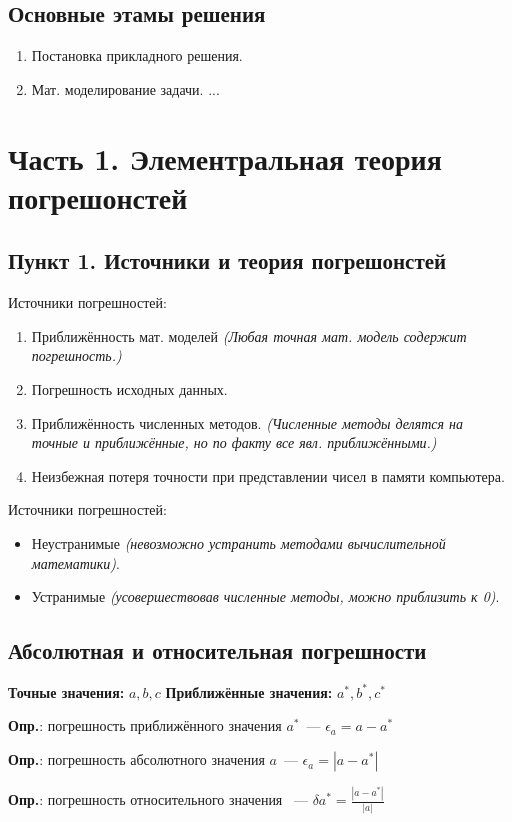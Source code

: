 \subsection{Основные этамы решения}

\begin{enumerate}
    \item Постановка прикладного решения.
    \item Мат. моделирование задачи.
    ...
\end{enumerate}


\section{Часть 1. Элементральная теория погрешонстей}

\subsection{Пункт 1. Источники и теория погрешонстей}

\noindent Источники погрешностей:
\begin{enumerate}
    \item Приближённость мат. моделей \textit{(Любая точная мат. модель содержит погрешность.)}
    \item Погрешность исходных данных.
    \item Приближённость численных методов. \textit{(Численные методы делятся на точные и приближённые, но по факту все явл. приближёнными.)}
    \item Неизбежная потеря точности при представлении чисел в памяти компьютера.
\end{enumerate}

\noindent Источники погрешностей:

\begin{itemize}
    \item Неустранимые \textit{(невозможно устранить методами вычислительной математики)}.
    \item Устранимые \textit{(усовершествовав численные методы, можно приблизить к 0)}.
\end{itemize}

\subsection{Абсолютная и относительная погрешности}

\textbf{Точные значения:} $a, b, c$
\textbf{Приближённые значения:} $a^*, b^*, c^*$

\noindent\textbf{Опр.}: погрешность приближённого значения $a^*$~--- $\epsilon_a = a - a^*$

\noindent\textbf{Опр.}: погрешность абсолютного значения $a$~--- $\epsilon_a = |a - a^*|$

\noindent\textbf{Опр.}: погрешность относительного значения ~--- $\delta a^* = \frac{|a - a^*|}{|a|}$
